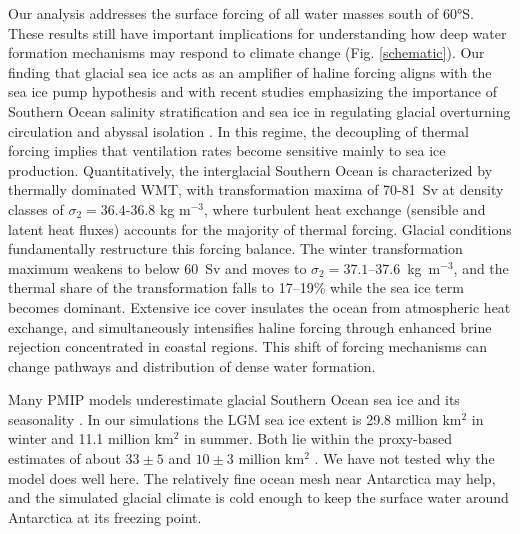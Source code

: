 \documentclass[pdflatex,sn-nature]{sn-jnl}
\begin{document}
Our analysis addresses the surface forcing of all water masses south of 60°S. These results still have important implications for understanding how deep water formation mechanisms may respond to climate change (Fig. \ref{schematic}). Our finding that glacial sea ice acts as an amplifier of haline forcing aligns with the sea ice pump hypothesis \cite{Abernathey2016} and with recent studies emphasizing the importance of Southern Ocean salinity stratification and sea ice in regulating glacial overturning circulation and abyssal isolation \cite{knorr2021salty}. In this regime, the decoupling of thermal forcing implies that ventilation rates become sensitive mainly to sea ice production. Quantitatively, the interglacial Southern Ocean is characterized by thermally dominated WMT, with transformation maxima of 70-81~Sv at density classes of $\sigma_2 = 36.4$-$36.8$ kg m$^{-3}$, where turbulent heat exchange (sensible and latent heat fluxes) accounts for the majority of thermal forcing. Glacial conditions fundamentally restructure this forcing balance. The winter transformation maximum weakens to below 60~Sv and moves to $\sigma_2 = 37.1$--$37.6$~kg~m$^{-3}$, and the thermal share of the transformation falls to 17--19\% while the sea ice term becomes dominant. Extensive ice cover insulates the ocean from atmospheric heat exchange, and simultaneously intensifies haline forcing through enhanced brine rejection concentrated in coastal regions. This shift of forcing mechanisms can change pathways and distribution of dense water formation. %

Many PMIP models underestimate glacial Southern Ocean sea ice and its seasonality \cite{Lhardy2021}. In our simulations the LGM sea ice extent is 29.8 million km$^2$ in winter and 11.1 million km$^2$ in summer. Both lie within the proxy-based estimates of about $33\pm5$ and $10\pm3$ million km$^2$ \cite{Lhardy2021}. We have not tested why the model does well here. The relatively fine ocean mesh near Antarctica may help, and the simulated glacial climate is cold enough to keep the surface water around Antarctica at its freezing point.
\end{document}
